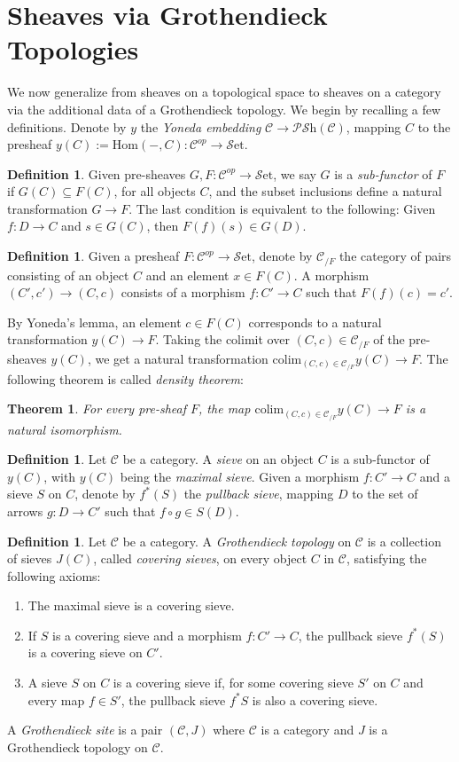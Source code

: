 \documentclass[10pt]{amsart}
\newcommand{\C}{\mathscr{C}}
\newcommand{\Hom}{\mathrm{Hom}}
\newcommand{\set}{\mathscr{S}\mathrm{et}}
\newcommand{\colim}{\mathrm{colim}}
\newcommand{\PSh}{\mathscr{P}\mathscr{S}\mathrm{h}}
\newtheorem{theorem}[equation]{Theorem}
\theoremstyle{definition}
\newtheorem{definition}[equation]{Definition}
\theoremstyle{remark}
\numberwithin{equation}{section}
\begin{document}
	\section{Sheaves via Grothendieck Topologies}
	
	We now generalize from sheaves on a topological space to sheaves on a category via the additional data of a Grothendieck topology. We begin by recalling a few definitions. Denote by $y$ the \textit{Yoneda embedding} $\C\to\PSh(\C)$, mapping $C$ to the presheaf $y(C):=\Hom(-,C)\colon\C^{op}\to\set$. 
	\begin{definition}
		Given pre-sheaves $G,F\colon\C^{op}\to\set$, we say $G$ is a \emph{sub-functor} of $F$ if $G(C)\subseteq F(C)$, for all objects $C$, and the subset inclusions define a natural transformation $G\to F$. The last condition is equivalent to the following: Given $f\colon D\to C$ and $s\in G(C)$, then $F(f)(s)\in G(D)$. 
	\end{definition}
	\begin{definition}
		Given a presheaf $F\colon\C^{op}\to\set$, denote by $\C_{/F}$ the category of pairs  consisting of an object $C$ and an element $x\in F(C)$. A morphism $(C',c')\to(C,c)$ consists of a morphism $f\colon C'\to C$ such that $F(f)(c)=c'$. 
	\end{definition}By Yoneda's lemma, an element $c\in F(C)$ corresponds to a natural transformation $y(C)\rightarrow F$. Taking the colimit over $(C,c)\in\C_{/F}$ of the pre-sheaves $y(C)$, we get a natural transformation $\colim_{(C,c)\in\C_{/F}}y(C)\rightarrow F$. The following theorem is called \textit{density theorem}:
	\begin{theorem}\label{density}
		For every pre-sheaf $F$, the map $\colim_{(C,c)\in\C_{/F}}y(C)\rightarrow F$ is a natural isomorphism.
	\end{theorem}
	\begin{definition}
		Let $\C$ be a category. A \emph{sieve} on an object $C$ is a sub-functor of $y(C)$, with $y(C)$ being the \textit{maximal sieve}. Given a morphism $f\colon C'\to C$ and a sieve $S$ on $C$, denote by $f^*(S)$ the \textit{pullback sieve}, mapping $D$ to the set of arrows $g\colon D\to C'$ such that $f\circ g\in S(D)$. 
	\end{definition}
	\begin{definition}
		Let $\C$ be a category. A \emph{Grothendieck topology} on $\C$ is a collection of sieves $J(C)$, called \textit{covering sieves}, on every object $C$ in $\C$, satisfying the following axioms:
		\begin{enumerate}
			\item The maximal sieve is a covering sieve.
			\item If $S$ is a covering sieve and a morphism $f\colon C' \to C$, the pullback sieve $f^*(S)$ is a covering sieve on $C'$.
			\item A sieve $S$ on $C$ is a covering sieve if, for some covering sieve $S'$ on $C$ and every map $f\in S'$, the pullback sieve $f^*S$ is also a covering sieve. 
		\end{enumerate}
		A \emph{Grothendieck site} is a pair $(\C, J)$ where $\C$ is a category and $J$ is a Grothendieck topology on $\C$.
	\end{definition}
\end{document}
